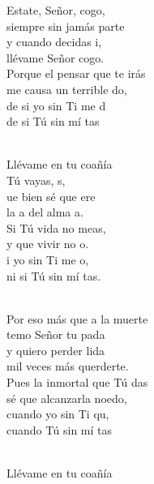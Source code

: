 \documentclass[12pt]{article}
\begin{document}
\begin{multicols*}{2}
\begin{cancion}%
	Estate, Señor, cogo, \\
	siempre sin jamás parte\\
	y cuando decidas i,\\
	llévame Señor cogo.\\
Porque el pensar que te irás \\
	me causa un terrible do,\\
	de si yo sin Ti me d\\
	de si Tú sin mí tas\\\jump\\
	\begin{chorus}%
	Llévame en tu coañía \\
	 Tú vayas, s, \\
	ue bien sé que ere \\
	la a del alma a.\\
	Si Tú vida no meas,\\
	y que vivir no o.\\
	i yo sin Ti me o, \\
	ni si Tú sin mí tas.\\
	\end{chorus}%
	\jump\\
Por eso más que a la muerte\\
	temo Señor tu pada\\
	y quiero perder lida\\
	mil veces más querderte.\\
Pues la inmortal que Tú das\\
	sé que alcanzarla noedo,\\
	cuando yo sin Ti qu,\\
	cuando Tú sin mí tas\\\jump\\
	\begin{chorus}%
	Llévame en tu coañía \\

\end{chorus}
\end{cancion}
\end{multicols*}
\end{document}
